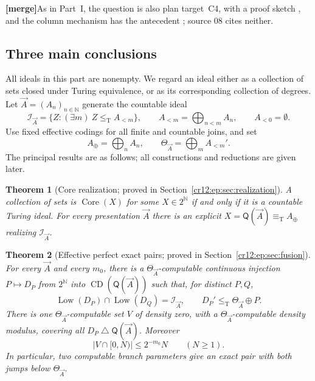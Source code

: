 \documentclass[11pt,letterpaper]{article}
\theoremstyle{plain}
\newtheorem{theorem}{Theorem}[section]
\theoremstyle{definition}
\theoremstyle{remark}
\numberwithin{equation}{section}
\newcommand{\N}{\mathbb N}
\newcommand{\Cantor}{2^{\N}}
\newcommand{\leT}{\leq_{\mathrm T}}
\newcommand{\eqT}{\equiv_{\mathrm T}}
\newcommand{\Core}{\operatorname{Core}}
\newcommand{\CD}{\operatorname{CD}}
\newcommand{\Low}{\operatorname{Low}}
\newcommand{\sd}{\mathbin{\triangle}}
\newcommand{\I}{\mathcal I}
\newcommand{\mergenote}[1]{\par\smallskip\noindent
 {\small\textsf{\textbf{[merge]}}\enspace #1}\par\smallskip}
\newcommand{\Aplus}{A_{\oplus}}          %
\newcommand{\Alt}[1]{A_{<#1}}            %
\newcommand{\QQ}{\mathsf Q}              %
\begin{document}
\mergenote{As in Part~I, the question is also plan target~C4, with a proof sketch
\cite{Plan}, and the column mechanism has the antecedent
\cite[Lemma~3.10 and Theorem~3.11]{HJS}; source 08 cites neither.}

\subsection{Three main conclusions}
All ideals in this part are nonempty. We regard an ideal either as a collection of
sets closed under Turing equivalence, or as its corresponding collection of degrees.
Let $\vec A=(A_n)_{n\in\N}$ generate the countable ideal
\begin{equation}\label{cr12:ep:eq:ideal}
 \I_{\vec A}=\{Z:(\exists m)\ Z\leT \Alt m\},
 \qquad \Alt m=\bigoplus_{n<m}A_n,
 \qquad \Alt 0=\emptyset.
\end{equation}
Use fixed effective codings for all finite and countable joins, and set
\begin{equation}\label{cr12:ep:eq:oracles}
 \Aplus=\bigoplus_n A_n,\qquad \Theta_{\vec A}=\bigoplus_m \Alt m'.
\end{equation}
The principal results are as follows; all constructions and reductions are given
later.

\begin{theorem}[Core realization; proved in Section~\ref{cr12:ep:sec:realization}]\label{cr12:ep:thm:headline-core}
A collection of sets is $\Core(X)$ for some $X\in\Cantor$ if and only if it is a
countable Turing ideal. For every presentation $\vec A$ there is an explicit
$X=\QQ(\vec A)\eqT \Aplus$ realizing $\I_{\vec A}$.
\end{theorem}

\begin{theorem}[Effective perfect exact pairs; proved in Section~\ref{cr12:ep:sec:fusion}]\label{cr12:ep:thm:headline-pairs}
For every $\vec A$ and every $m_0$, there is a $\Theta_{\vec A}$-computable continuous
injection $P\mapsto D_P$ from $\Cantor$ into $\CD(\QQ(\vec A))$ such that, for
distinct $P,Q$,
\begin{equation}\label{cr12:ep:eq:headline-exact}
 \Low(D_P)\cap\Low(D_Q)=\I_{\vec A},
 \qquad D_P'\leT \Theta_{\vec A}\oplus P.
\end{equation}
There is one $\Theta_{\vec A}$-computable set $V$ of density zero, with a
$\Theta_{\vec A}$-computable density modulus, covering all $D_P\sd\QQ(\vec A)$.
Moreover
\[
 |V\cap[0,N)|\le 2^{-m_0}N\qquad(N\ge1).
\]
In particular, two computable branch parameters give an exact pair with both jumps
below $\Theta_{\vec A}$.
\end{theorem}
\end{document}
